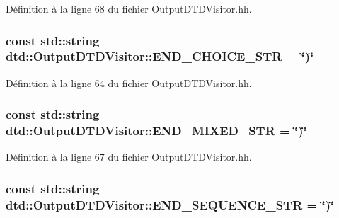 Définition à la ligne 68 du fichier OutputDTDVisitor.hh.

\hypertarget{classdtd_1_1_output_d_t_d_visitor_ab0306525af8ca54d3279c02a2d79da46}{
\subsubsection[{END\_\-CHOICE\_\-STR}]{\setlength{\rightskip}{0pt plus 5cm}const std::string {\bf dtd::OutputDTDVisitor::END\_\-CHOICE\_\-STR} = \char`\"{})\char`\"{}}}
\label{classdtd_1_1_output_d_t_d_visitor_ab0306525af8ca54d3279c02a2d79da46}


Définition à la ligne 64 du fichier OutputDTDVisitor.hh.

\hypertarget{classdtd_1_1_output_d_t_d_visitor_a217915df1bfe131dae99679461140fcc}{
\subsubsection[{END\_\-MIXED\_\-STR}]{\setlength{\rightskip}{0pt plus 5cm}const std::string {\bf dtd::OutputDTDVisitor::END\_\-MIXED\_\-STR} = \char`\"{})\char`\"{}}}
\label{classdtd_1_1_output_d_t_d_visitor_a217915df1bfe131dae99679461140fcc}


Définition à la ligne 67 du fichier OutputDTDVisitor.hh.

\hypertarget{classdtd_1_1_output_d_t_d_visitor_a17ea023b24838b7b2a96fe56a2c574ea}{
\subsubsection[{END\_\-SEQUENCE\_\-STR}]{\setlength{\rightskip}{0pt plus 5cm}const std::string {\bf dtd::OutputDTDVisitor::END\_\-SEQUENCE\_\-STR} = \char`\"{})\char`\"{}}}
\label{classdtd_1_1_output_d_t_d_visitor_a17ea023b24838b7b2a96fe56a2c574ea}


